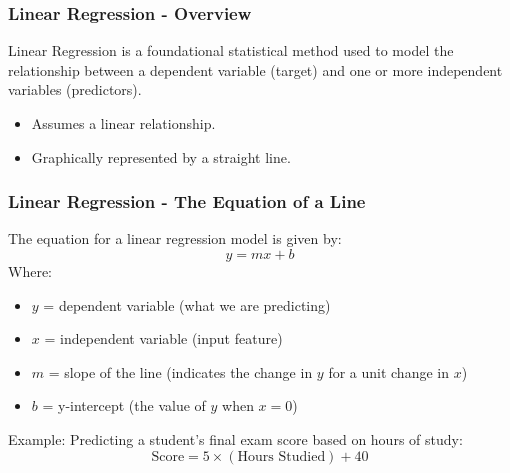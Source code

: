 \documentclass{beamer}
\begin{document}
\begin{frame}[fragile]
    \frametitle{Linear Regression - Overview}
    Linear Regression is a foundational statistical method used to model the relationship between a dependent variable (target) and one or more independent variables (predictors). 
    \begin{itemize}
        \item Assumes a linear relationship.
        \item Graphically represented by a straight line.
    \end{itemize}
\end{frame}

\begin{frame}[fragile]
    \frametitle{Linear Regression - The Equation of a Line}
    The equation for a linear regression model is given by:
    \begin{equation}
    y = mx + b 
    \end{equation}
    Where:
    \begin{itemize}
        \item $y$ = dependent variable (what we are predicting)
        \item $x$ = independent variable (input feature)
        \item $m$ = slope of the line (indicates the change in $y$ for a unit change in $x$)
        \item $b$ = y-intercept (the value of $y$ when $x = 0$)
    \end{itemize}
    
    \begin{block}{Example:}
    Predicting a student's final exam score based on hours of study:
    \begin{equation}
    \text{Score} = 5 \times (\text{Hours Studied}) + 40 
    \end{equation}
    \end{block}
\end{frame}
\end{document}

